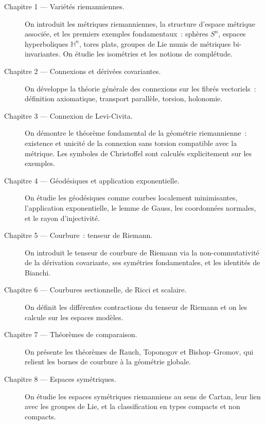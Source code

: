 \begin{description}
    \item[Chapitre 1 --- Vari\'et\'es riemanniennes.]
    On introduit les m\'etriques riemanniennes, la structure d'espace m\'etrique
    associ\'ee, et les premiers exemples fondamentaux~: sph\`eres $S^n$, espaces
    hyperboliques $\mathbb{H}^n$, tores plats, groupes de Lie munis de m\'etriques
    bi-invariantes. On \'etudie les isom\'etries et les notions de compl\'etude.

    \item[Chapitre 2 --- Connexions et d\'eriv\'ees covariantes.]
    On d\'eveloppe la th\'eorie g\'en\'erale des connexions sur les fibr\'es vectoriels~:
    d\'efinition axiomatique, transport parall\`ele, torsion, holonomie.

    \item[Chapitre 3 --- Connexion de Levi-Civita.]
    On d\'emontre le th\'eor\`eme fondamental de la g\'eom\'etrie riemannienne~:
    existence et unicit\'e de la connexion sans torsion compatible avec la m\'etrique.
    Les symboles de Christoffel sont calcul\'es explicitement sur les exemples.

    \item[Chapitre 4 --- G\'eod\'esiques et application exponentielle.]
    On \'etudie les g\'eod\'esiques comme courbes localement minimisantes,
    l'application exponentielle, le lemme de Gauss, les coordonn\'ees normales,
    et le rayon d'injectivit\'e.

    \item[Chapitre 5 --- Courbure~: tenseur de Riemann.]
    On introduit le tenseur de courbure de Riemann via la non-commutativit\'e
    de la d\'erivation covariante, ses sym\'etries fondamentales, et les identit\'es
    de Bianchi.

    \item[Chapitre 6 --- Courbures sectionnelle, de Ricci et scalaire.]
    On d\'efinit les diff\'erentes contractions du tenseur de Riemann et on les
    calcule sur les espaces mod\`eles.

    \item[Chapitre 7 --- Th\'eor\`emes de comparaison.]
    On pr\'esente les th\'eor\`emes de Rauch, Toponogov et Bishop--Gromov,
    qui relient les bornes de courbure \`a la g\'eom\'etrie globale.

    \item[Chapitre 8 --- Espaces sym\'etriques.]
    On \'etudie les espaces sym\'etriques riemanniens au sens de Cartan,
    leur lien avec les groupes de Lie, et la classification en types compacts
    et non compacts.


\end{description}
